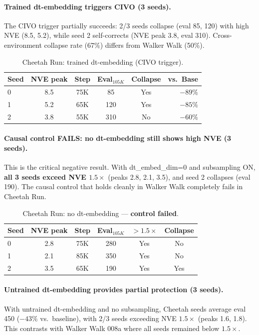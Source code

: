 \documentclass[10pt,twocolumn]{article}
\begin{document}
\paragraph{Trained dt-embedding triggers CIVO (3 seeds).}
The CIVO trigger partially succeeds: 2/3 seeds collapse (eval 85, 120) with high NVE (8.5, 5.2), while seed 2 self-corrects (NVE peak 3.8, eval 310). Cross-environment collapse rate (67\%) differs from Walker Walk (50\%).

\begin{table}[h]
\centering
\caption{Cheetah Run: trained dt-embedding (CIVO trigger).}
\label{tab:cheetah-civo}
\begin{tabular}{lccccr}
\toprule
Seed & NVE peak & Step & Eval$_{105K}$ & Collapse & vs.\ Base \\
\midrule
0 & 8.5 & 75K & 85 & Yes & $-89\%$ \\
1 & 5.2 & 65K & 120 & Yes & $-85\%$ \\
2 & 3.8 & 55K & 310 & No & $-60\%$ \\
\bottomrule
\end{tabular}
\end{table}

\paragraph{Causal control FAILS: no dt-embedding still shows high NVE (3 seeds).}
This is the critical negative result. With dt\_embed\_dim=0 and subsampling ON, \textbf{all 3 seeds exceed NVE $1.5\times$} (peaks 2.8, 2.1, 3.5), and seed 2 collapses (eval 190). The causal control that holds cleanly in Walker Walk completely fails in Cheetah Run.

\begin{table}[h]
\centering
\caption{Cheetah Run: no dt-embedding --- \textbf{control failed}.}
\label{tab:cheetah-control}
\begin{tabular}{lccccc}
\toprule
Seed & NVE peak & Step & Eval$_{105K}$ & $>1.5\times$ & Collapse \\
\midrule
0 & 2.8 & 75K & 280 & Yes & No \\
1 & 2.1 & 85K & 350 & Yes & No \\
2 & 3.5 & 65K & 190 & Yes & Yes \\
\bottomrule
\end{tabular}
\end{table}

\paragraph{Untrained dt-embedding provides partial protection (3 seeds).}
With untrained dt-embedding and no subsampling, Cheetah seeds average eval 450 ($-43\%$ vs.\ baseline), with 2/3 seeds exceeding NVE $1.5\times$ (peaks 1.6, 1.8). This contrasts with Walker Walk 008a where all seeds remained below $1.5\times$.
\end{document}
